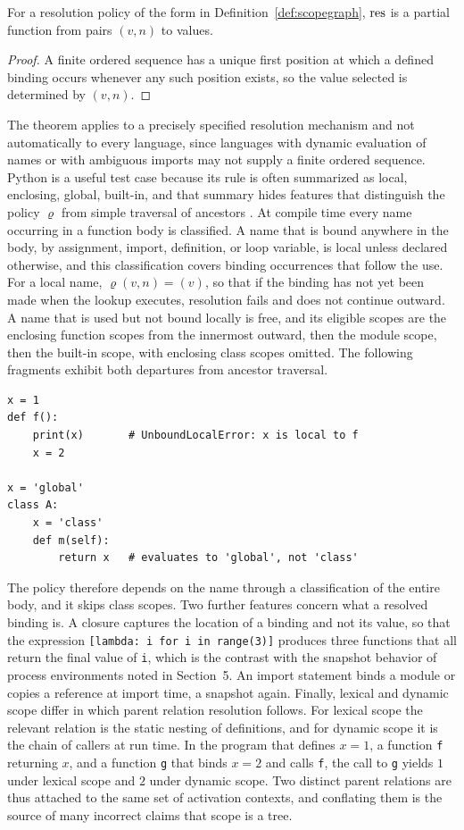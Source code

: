 \begin{theorem}\label{thm:determinacy}
For a resolution policy of the form in Definition~\ref{def:scopegraph}, $\operatorname{res}$ is a partial function from pairs $(v,n)$ to values.
\end{theorem}
\begin{proof}
A finite ordered sequence has a unique first position at which a defined binding occurs whenever any such position exists, so the value selected is determined by $(v,n)$.
\end{proof}

The theorem applies to a precisely specified resolution mechanism and not automatically to every language, since languages with dynamic evaluation of names or with ambiguous imports may not supply a finite ordered sequence. Python is a useful test case because its rule is often summarized as local, enclosing, global, built-in, and that summary hides features that distinguish the policy $\varrho$ from simple traversal of ancestors \cite{pyref}. At compile time every name occurring in a function body is classified. A name that is bound anywhere in the body, by assignment, import, definition, or loop variable, is local unless declared otherwise, and this classification covers binding occurrences that follow the use. For a local name, $\varrho(v,n)=(v)$, so that if the binding has not yet been made when the lookup executes, resolution fails and does not continue outward. A name that is used but not bound locally is free, and its eligible scopes are the enclosing function scopes from the innermost outward, then the module scope, then the built-in scope, with enclosing class scopes omitted. The following fragments exhibit both departures from ancestor traversal.
\begin{verbatim}
x = 1
def f():
    print(x)       # UnboundLocalError: x is local to f
    x = 2

x = 'global'
class A:
    x = 'class'
    def m(self):
        return x   # evaluates to 'global', not 'class'
\end{verbatim}
The policy therefore depends on the name through a classification of the entire body, and it skips class scopes. Two further features concern what a resolved binding is. A closure captures the location of a binding and not its value, so that the expression \texttt{[lambda: i for i in range(3)]} produces three functions that all return the final value of \texttt{i}, which is the contrast with the snapshot behavior of process environments noted in Section~5. An import statement binds a module or copies a reference at import time, a snapshot again. Finally, lexical and dynamic scope differ in which parent relation resolution follows. For lexical scope the relevant relation is the static nesting of definitions, and for dynamic scope it is the chain of callers at run time. In the program that defines $x=1$, a function \texttt{f} returning $x$, and a function \texttt{g} that binds $x=2$ and calls \texttt{f}, the call to \texttt{g} yields $1$ under lexical scope and $2$ under dynamic scope. Two distinct parent relations are thus attached to the same set of activation contexts, and conflating them is the source of many incorrect claims that scope is a tree.

